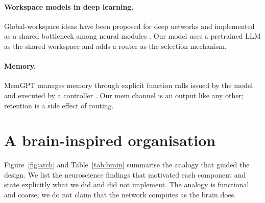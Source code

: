 \documentclass[10pt]{article}
\begin{document}
\paragraph{Workspace models in deep learning.} Global-workspace ideas have been proposed for deep networks \citep{vanrullen2021deep} and implemented as a shared bottleneck among neural modules \citep{goyal2021coordination}. Our model uses a pretrained LLM as the shared workspace and adds a router as the selection mechanism.

\paragraph{Memory.} MemGPT manages memory through explicit function calls issued by the model and executed by a controller \citep{packer2023memgpt}. Our mem channel is an output like any other; retention is a side effect of routing.

\section{A brain-inspired organisation}\label{sec:brain}
Figure~\ref{fig:arch} and Table~\ref{tab:brain} summarise the analogy that guided the design. We list the neuroscience findings that motivated each component and state explicitly what we did and did not implement. The analogy is functional and coarse; we do not claim that the network computes as the brain does.
\end{document}
